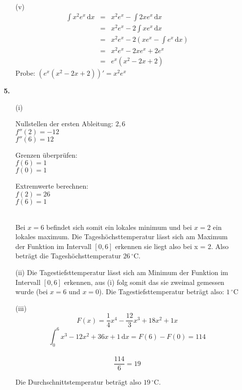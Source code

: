\documentclass[a4paper,11pt]{scrartcl}
\newcommand{\dx}[0]{\, \mathrm{d}x}
\begin{document}
\begin{enumerate}
\begin{enumerate}
            \item[(v)]
            \begin{eqnarray}
                \int x^2e^x\, \mathrm{d}x &=& x^2e^x - \int 2xe^x \dx \\
                &=& x^2e^x - 2 \int xe^x \dx \\
                &=& x^2e^x - 2 \left( xe^x - \int e^x \dx \right) \\
                &=& x^2e^x - 2xe^x + 2e^x \\
                &=& e^x(x^2 - 2x + 2)
            \end{eqnarray}
            Probe: $(e^x(x^2 - 2x + 2))' = x^2e^x$
        \end{enumerate}
    \item[\textbf{5.}]
        \begin{enumerate}
            \item[(i)]
            \begin{multicols}{2}
            Nullstellen der ersten Ableitung: $2,6$ \\
            $f''(2) = -12$ \\
            $f''(6) = 12$

            Grenzen überprüfen: \\
            $f(6) = 1$ \\
            $f(0) = 1$

            Extremwerte berechnen: \\
            $f(2) = 26$ \\
            $f(6) = 1$ \\
            \\
            \end{multicols}
            Bei $x = 6$ befindet sich somit ein lokales minimum und bei $x = 2$ ein lokales maximum.
            Die Tageshöchsttemperatur lässt sich am Maximum der Funktion im Intervall $[0,6]$ erkennen sie liegt also bei x = 2.
            Also beträgt die Tageshöchsttemperatur $26\,^{\circ}\mathrm{C}.$
            
            \item[(ii)]
            Die Tagestiefsttemperatur lässt sich am Minimum der Funktion im Intervall $[0,6]$ erkennen, aus (i) folg somit das sie zweimal gemessen wurde (bei $x = 6$ und $x = 0$).
            Die Tagestiefsttemperatur beträgt also: $1\,^{\circ}\mathrm{C}$
            \item[(iii)]
            \[ F(x) = \frac{1}{4}x^4 - \frac{12}{3}x^3 + 18x^2 + 1x\]
            \[ \int_0^6 x^3 - 12x^2 + 36x + 1 \, \mathrm{d}x = F(6) - F(0) = 114\] \\
            \[ \frac{114}{6} = 19 \]

            Die Durchschnittstemperatur beträgt also $19\,^{\circ}\mathrm{C}$.
        \end{enumerate}
\end{enumerate}
\end{document}
